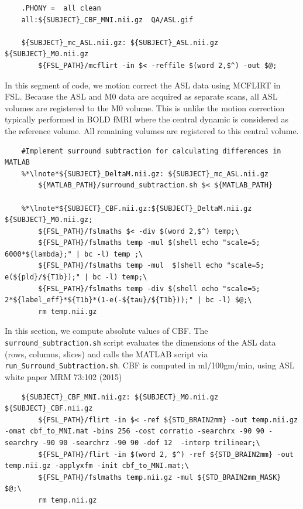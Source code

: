 \begin{lstlisting}
	.PHONY =  all clean
	all:${SUBJECT}_CBF_MNI.nii.gz  QA/ASL.gif
	
	${SUBJECT}_mc_ASL.nii.gz: ${SUBJECT}_ASL.nii.gz ${SUBJECT}_M0.nii.gz
		${FSL_PATH}/mcflirt -in $< -reffile $(word 2,$^) -out $@;
\end{lstlisting}

In this segment of code, we motion correct the ASL data using MCFLIRT in FSL. Because the ASL and M0 data are acquired as separate scans, all ASL volumes are registered to the M0 volume. This is unlike the motion correction typically performed in BOLD fMRI where the central dynamic is considered as the reference volume. All remaining volumes are registered to this central volume.

\begin{lstlisting}
	#Implement surround subtraction for calculating differences in MATLAB
	%*\lnote*${SUBJECT}_DeltaM.nii.gz: ${SUBJECT}_mc_ASL.nii.gz 
		${MATLAB_PATH}/surround_subtraction.sh $< ${MATLAB_PATH} 
	
	%*\lnote*${SUBJECT}_CBF.nii.gz:${SUBJECT}_DeltaM.nii.gz ${SUBJECT}_M0.nii.gz;
		${FSL_PATH}/fslmaths $< -div $(word 2,$^) temp;\
		${FSL_PATH}/fslmaths temp -mul $(shell echo "scale=5; 6000*${lambda};" | bc -l) temp ;\
		${FSL_PATH}/fslmaths temp -mul  $(shell echo "scale=5; e(${pld}/${T1b});" | bc -l) temp;\
		${FSL_PATH}/fslmaths temp -div $(shell echo "scale=5; 2*${label_eff}*${T1b}*(1-e(-${tau}/${T1b}));" | bc -l) $@;\
		rm temp.nii.gz
\end{lstlisting}

In this section, we compute absolute values of CBF. \lnum{4} The \texttt{surround_subtraction.sh} script evaluates the dimensions of the ASL data (rows, columns, slices) and calls the MATLAB script via \texttt{run_Surround_Subtraction.sh}.  CBF is computed in ml/100gm/min, using ASL white paper MRM 73:102 (2015)

\begin{lstlisting}
	${SUBJECT}_CBF_MNI.nii.gz: ${SUBJECT}_M0.nii.gz ${SUBJECT}_CBF.nii.gz
		${FSL_PATH}/flirt -in $< -ref ${STD_BRAIN2mm} -out temp.nii.gz -omat cbf_to_MNI.mat -bins 256 -cost corratio -searchrx -90 90 -searchry -90 90 -searchrz -90 90 -dof 12  -interp trilinear;\
		${FSL_PATH}/flirt -in $(word 2, $^) -ref ${STD_BRAIN2mm} -out temp.nii.gz -applyxfm -init cbf_to_MNI.mat;\
		${FSL_PATH}/fslmaths temp.nii.gz -mul ${STD_BRAIN2mm_MASK} $@;\
		rm temp.nii.gz
\end{lstlisting}

